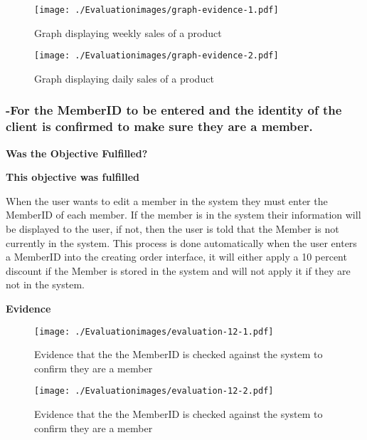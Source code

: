 \begin{figure}[H]
\caption{Graph displaying weekly sales of a product} \label{fig:graph-evidence-1}
\hfill\texttt{[image: ./Evaluationimages/graph-evidence-1.pdf]}
\end{figure}

\begin{figure}[H]
\caption{Graph displaying daily sales of a product} \label{fig:graph-evidence-2}
\hfill\texttt{[image: ./Evaluationimages/graph-evidence-2.pdf]}
\end{figure}




\pagebreak
\subsubsection{-For the MemberID to be entered and the identity of the client is confirmed to make sure they are a member.}

\textbf{Was the Objective Fulfilled?} \newline

\textbf{\large{This objective was fulfilled}}

When the user wants to edit a member in the system they must enter the MemberID of each member. If the member is in the system their information will be displayed to the user, if not, then the user is told that the Member is not currently in the system. This process is done automatically when the user enters a MemberID into the creating order interface, it will either apply a 10 percent discount if the Member is stored in the system and will not apply it if they are not in the system.

\pagebreak

\textbf{Evidence} \newline

\begin{figure}[H]
\caption{Evidence that the the MemberID is checked against the system to confirm they are a member} \label{fig:evaluation-12-1}
\hfill\texttt{[image: ./Evaluationimages/evaluation-12-1.pdf]}
\end{figure}

\begin{figure}[H]
\caption{Evidence that the the MemberID is checked against the system to confirm they are a member} \label{fig:evaluation-12-2}
\hfill\texttt{[image: ./Evaluationimages/evaluation-12-2.pdf]}
\end{figure}






